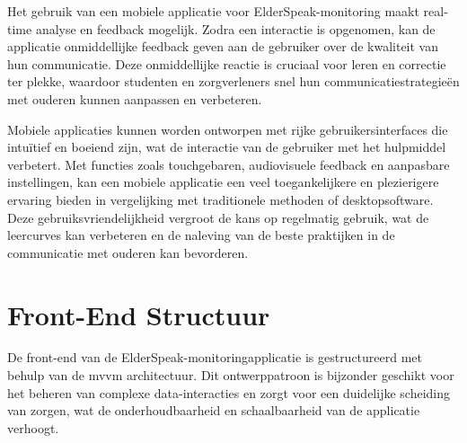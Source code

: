 Het gebruik van een mobiele applicatie voor ElderSpeak-monitoring maakt real-time analyse en feedback mogelijk. Zodra een interactie is opgenomen, kan de applicatie onmiddellijke feedback geven aan de gebruiker over de kwaliteit van hun communicatie. Deze onmiddellijke reactie is cruciaal voor leren en correctie ter plekke, waardoor studenten en zorgverleners snel hun communicatiestrategieën met ouderen kunnen aanpassen en verbeteren.


Mobiele applicaties kunnen worden ontworpen met rijke gebruikersinterfaces die intuïtief en boeiend zijn, wat de interactie van de gebruiker met het hulpmiddel verbetert. Met functies zoals touchgebaren, audiovisuele feedback en aanpasbare instellingen, kan een mobiele applicatie een veel toegankelijkere en plezierigere ervaring bieden in vergelijking met traditionele methoden of desktopsoftware. Deze gebruiksvriendelijkheid vergroot de kans op regelmatig gebruik, wat de leercurves kan verbeteren en de naleving van de beste praktijken in de communicatie met ouderen kan bevorderen.


\section{Front-End Structuur}
De front-end van de ElderSpeak-monitoringapplicatie is gestructureerd met behulp van de \gls{mvvm} architectuur. Dit ontwerppatroon is bijzonder geschikt voor het beheren van complexe data-interacties en zorgt voor een duidelijke scheiding van zorgen, wat de onderhoudbaarheid en schaalbaarheid van de applicatie verhoogt.



